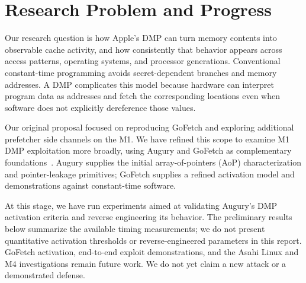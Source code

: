\section{Research Problem and Progress}
Our research question is how Apple's DMP can turn memory contents into observable cache activity, and how consistently that behavior appears across access patterns, operating systems, and processor generations. Conventional constant-time programming avoids secret-dependent branches and memory addresses. A DMP complicates this model because hardware can interpret program data as addresses and fetch the corresponding locations even when software does not explicitly dereference those values.

Our original proposal focused on reproducing GoFetch and exploring additional prefetcher side channels on the M1. We have refined this scope to examine M1 DMP exploitation more broadly, using Augury and GoFetch as complementary foundations~\cite{augury,gofetch}. Augury supplies the initial array-of-pointers (AoP) characterization and pointer-leakage primitives; GoFetch supplies a refined activation model and demonstrations against constant-time software.

At this stage, we have run experiments aimed at validating Augury's DMP activation criteria and reverse engineering its behavior. The preliminary results below summarize the available timing measurements; we do not present quantitative activation thresholds or reverse-engineered parameters in this report. GoFetch activation, end-to-end exploit demonstrations, and the Asahi Linux and M4 investigations remain future work. We do not yet claim a new attack or a demonstrated defense.
